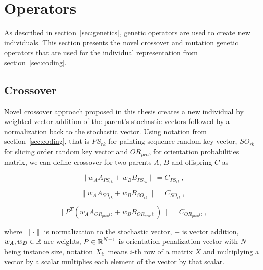 \clearpage%
\newpage
\section{Operators}\label{sec:operators}
As described in section~\ref{sec:genetics}, genetic operators are used to create
new individuals.
This section presents the novel crossover and mutation genetic operators
that are used for the individual representation from section~\ref{sec:coding}.

\subsection{Crossover}\label{subsec:crossover}

Novel crossover approach proposed in this thesis
creates a new individual by weighted vector addition of the parent's stochastic vectors followed by a normalization back to the stochastic vector.
Using notation from section~\ref{sec:coding}, that is
$PS_{rk}$ for painting sequence random key vector,
$SO_{rk}$ for slicing order random key vector and
$OR_{prob}$ for orientation probabilities matrix,
we can define crossover for two parents $A$, $B$ and offspring $C$ as

\begin{equation}
    \|w_A A_{PS_{rk}} + w_B B_{PS_{rk}}\| = C_{PS_{rk}}\,,
    \label{eq:crossover-psrk}
\end{equation}

\begin{equation}
    \|w_A A_{SO_{rk}} + w_B B_{SO_{rk}}\| = C_{SO_{rk}}\,,
    \label{eq:crossover-sork}
\end{equation}

\begin{equation}
    \|P^T(w_A A_{OR_{prob}i:} + w_B B_{OR_{prob}i:})\| = C_{OR_{prob}i:}\,,
    \label{eq:crossover-orprob}
\end{equation}

where $\|\cdot\|$ is normalization to the stochastic vector\footnotemark[1], $+$ is vector addition, $w_A, w_B \in \operatorname*{\mathbb{R}}$ are weights,
$P \in \operatorname*{\mathbb{R}}^{N-1}$ is orientation penalization vector with $N$ being instance size, notation $X_{i:}$ means $i$-th row of a matrix $X$
and multiplying a vector by a scalar multiplies each element of the vector by that scalar.


